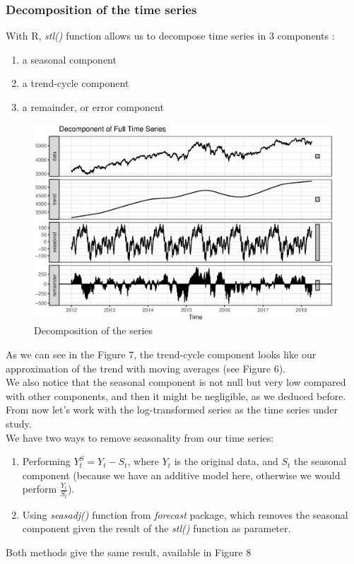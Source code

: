 \subsubsection{Decomposition of the time series}
With R, \textit{stl()} function allows us to decompose time series in 3 components :
\begin{enumerate}
  \item a seasonal component
  \item a trend-cycle component
  \item a remainder, or error component
\end{enumerate}

\FloatBarrier
\begin{figure}[!htbp]
  \centering
  \includegraphics[width=\textwidth]{img/Fig7.eps}
  \caption{Decomposition of the series}
\end{figure}
\FloatBarrier

As we can see in the Figure 7, the trend-cycle component looks like our approximation of the trend with moving averages (see Figure 6). \\
We also notice that the seasonal component is not null but very low compared with other components, and then it might be negligible, as we deduced before.\\

From now let's work with the log-transformed series as the time series under study. \\
We have two ways to remove seasonality from our time series:
\begin{enumerate}
\item Performing $Y_t^S = Y_t - S_t$, where $Y_t$ is the original data, and $S_t$ the seasonal component (because we have an additive model here, otherwise we would perform $\frac{Y_t}{S_t}$).
\item Using \textit{seasadj()} function from \textit{forecast} package, which removes the seasonal component given the result of the \textit{stl()} function as parameter.
\end{enumerate}
Both methods give the same result, available in Figure 8 \\

